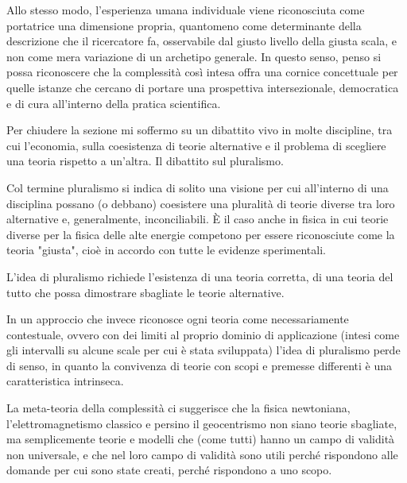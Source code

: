 \documentclass[a4paper, headings=standardclasses]{scrartcl}
\begin{document}
Allo stesso modo, l'esperienza umana individuale viene riconosciuta come portatrice una dimensione propria, quantomeno come determinante della descrizione che il ricercatore fa, osservabile dal giusto livello della giusta scala, e non come mera variazione di un archetipo generale. 
In questo senso, penso si possa riconoscere che la complessità così intesa offra una cornice concettuale per quelle istanze che cercano di portare una prospettiva intersezionale, democratica e di cura all'interno della pratica scientifica.

Per chiudere la sezione mi soffermo su un dibattito vivo in molte discipline, tra cui l'economia, sulla coesistenza di teorie alternative e il problema di scegliere una teoria rispetto a un'altra. Il dibattito sul pluralismo. 

Col termine pluralismo si indica di solito una visione per cui all'interno di una disciplina possano (o debbano) coesistere una pluralità di teorie diverse tra loro alternative e, generalmente, inconciliabili. 
È il caso anche in fisica in cui teorie diverse per la fisica delle alte energie competono per essere riconosciute come la teoria "giusta", cioè in accordo con tutte le evidenze sperimentali.

L'idea di pluralismo richiede l'esistenza di una teoria corretta, di una teoria del tutto che possa dimostrare sbagliate le teorie alternative.

In un approccio che invece riconosce ogni teoria come necessariamente contestuale, ovvero con dei limiti al proprio dominio di applicazione (intesi come gli intervalli su alcune scale per cui è stata sviluppata) l'idea di pluralismo perde di senso, in quanto la convivenza di teorie con scopi e premesse differenti è una caratteristica intrinseca.

La meta-teoria della complessità ci suggerisce che la fisica newtoniana, l'elettromagnetismo classico e persino il geocentrismo non siano teorie sbagliate, ma semplicemente teorie e modelli che (come tutti) hanno un campo di validità non universale, e che nel loro campo di validità sono utili perché rispondono alle domande per cui sono state creati, perché rispondono a uno scopo.
\end{document}
